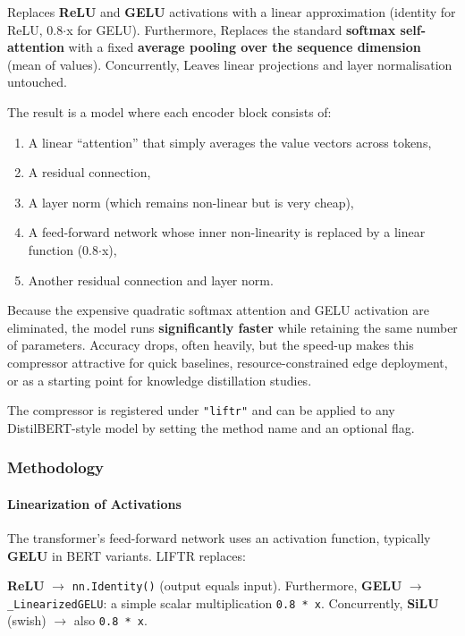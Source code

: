 Replaces \textbf{ReLU} and \textbf{GELU} activations with a linear approximation (identity for ReLU, 0.8$\cdot$x for GELU). Furthermore, Replaces the standard \textbf{softmax self-attention} with a fixed \textbf{average pooling over the sequence dimension} (mean of values). Concurrently, Leaves linear projections and layer normalisation untouched.


The result is a model where each encoder block consists of:
\begin{enumerate}
\item A linear ``attention'' that simply averages the value vectors across tokens,
\item A residual connection,
\item A layer norm (which remains non-linear but is very cheap),
\item A feed-forward network whose inner non-linearity is replaced by a linear function (0.8$\cdot$x),
\item Another residual connection and layer norm.

\end{enumerate}
Because the expensive quadratic softmax attention and GELU activation are eliminated, the model runs \textbf{significantly faster} while retaining the same number of parameters. Accuracy drops, often heavily, but the speed-up makes this compressor attractive for quick baselines, resource-constrained edge deployment, or as a starting point for knowledge distillation studies.

The compressor is registered under \texttt{"liftr"} and can be applied to any DistilBERT-style model by setting the method name and an optional flag.


\subsubsection*{Methodology}

\paragraph{Linearization of Activations}

The transformer's feed-forward network uses an activation function, typically \textbf{GELU} in BERT variants. LIFTR replaces:

\textbf{ReLU} $\rightarrow$ \texttt{nn.Identity()} (output equals input). Furthermore, \textbf{GELU} $\rightarrow$ \texttt{\_LinearizedGELU}: a simple scalar multiplication \texttt{0.8 * x}. Concurrently, \textbf{SiLU} (swish) $\rightarrow$ also \texttt{0.8 * x}.



